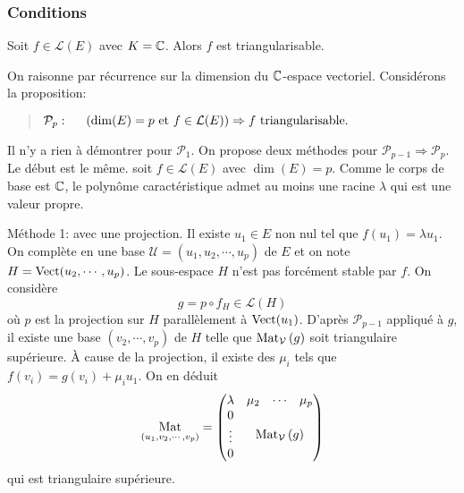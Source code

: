 \subsubsection{Conditions}
\begin{propn}
  Soit $f\in \mathcal{L}(E)$ avec $K = \mathbb{C}$. Alors $f$ est triangularisable.
\end{propn}
\begin{demo}
  On raisonne par récurrence sur la dimension du $\mathbb{C}$-espace vectoriel. Considérons la proposition:
  \begin{quote}
    $\mathcal{P}_p : \hspace{0.5cm} \left( \dim(E) = p \text{ et } f\in \mathcal{L}(E)\right) \Rightarrow f \text{ triangularisable}.$
  \end{quote}
Il n'y a rien à démontrer pour $\mathcal{P}_1$. On propose deux méthodes pour $\mathcal{P}_{p-1} \Rightarrow \mathcal{P}_p$.\newline
Le début est le même. soit $f\in \mathcal{L}(E)$ avec $\dim(E)=p$. Comme le corps de base est $\mathbb{C}$, le polynôme caractéristique admet au moins une racine $\lambda$ qui est une valeur propre.

Méthode 1: avec une projection.\newline
Il existe $u_1\in E$ non nul tel que $f(u_1) = \lambda u_1$. On complète en une base $\mathcal{U} = (u_1,u_2,\cdots,u_p)$ de $E$ et on note $H = \mathop{\mathrm{Vect}}(u_2,\cdots,u_p)$.\newline
Le sous-espace $H$ n'est pas forcément stable par $f$. On considère
\[
  g = p \circ f_H \in \mathcal{L}(H)
\]
où $p$ est la projection sur $H$ parallèlement à $\mathop{\mathrm{Vect}}(u_1)$. D'après $\mathcal{P}_{p-1}$ appliqué à $g$, il existe une base $(v_2, \cdots, v_p)$ de $H$ telle que $\mathop{\mathrm{Mat}}_{\mathcal{V}}\left( g\right)$ soit triangulaire supérieure. \`A cause de la projection, il existe des $\mu_i$ tels que $f(v_i) = g(v_i) + \mu_i u_1$. On en déduit 
\[
  \mathop{\mathrm{Mat}}_{(u_1,v_2,\cdots,v_p)}=
  \begin{pmatrix}
    \lambda                                        &   \begin{matrix} \mu_2 & \cdots & \mu_p \end{matrix}\\
    \begin{matrix} 0 \\ \vdots \\0 \end{matrix}    & \mathop{\mathrm{Mat}}_{\mathcal{V}}\left( g\right)
  \end{pmatrix}
\]
qui est triangulaire supérieure.\medskip


\end{demo}
